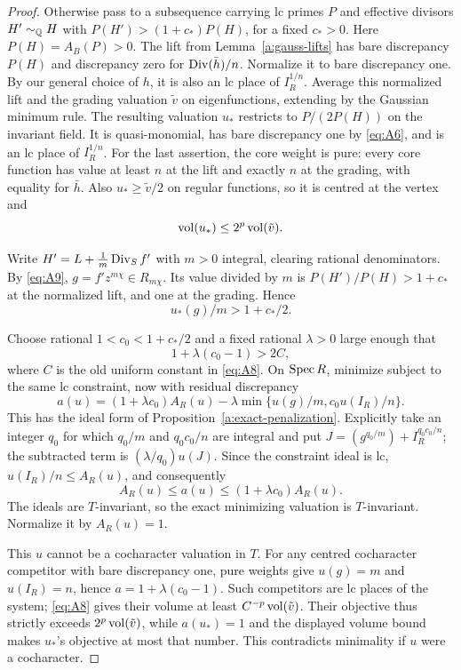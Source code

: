 \begin{proof}
Otherwise pass to a subsequence carrying lc primes \(P\) and effective
divisors \(H'\sim_{\mathbb Q}H\) with
\(P(H')>(1+c_*)P(H)\), for a fixed \(c_*>0\).
Here \(P(H)=A_B(P)>0\). The lift from
Lemma~\ref{a:gauss-lifts} has bare discrepancy \(P(H)\) and discrepancy
zero for \(\operatorname{Div}(\bar h)/n\). Normalize it to bare discrepancy one.
By our general choice of \(h\), it is also an lc place of \(I_R^{1/n}\).
Average this normalized lift and the grading valuation \(\tilde v\)
on eigenfunctions, extending by the Gaussian minimum rule. The resulting
valuation \(u_*\) restricts to \(P/(2P(H))\) on the invariant field.
It is quasi-monomial, has bare discrepancy one by \eqref{eq:A6}, and
is an lc place of \(I_R^{1/n}\). For the last assertion, the core
weight is pure: every core function has value at least \(n\) at the
lift and exactly \(n\) at the grading, with equality for \(\bar h\).
Also \(u_*\geq\tilde v/2\) on regular functions, so it is centred at
the vertex and
\[
                       \operatorname{vol}(u_*)\leq2^p\operatorname{vol}(\tilde v).
\]

Write \(H'=L+\frac1m\operatorname{Div}_S f'\) with \(m>0\) integral, clearing
rational denominators. By \eqref{eq:A9}, \(g=f'z^{m\chi}\in R_{m\chi}\).
Its value divided by \(m\) is \(P(H')/P(H)>1+c_*\) at the normalized
lift, and one at the grading. Hence
\[
                         u_*(g)/m>1+c_*/2.
\]

Choose rational \(1<c_0<1+c_*/2\) and a fixed rational \(\lambda>0\)
large enough that
\[
                         1+\lambda(c_0-1)>2C,
\]
where \(C\) is the old uniform constant in \eqref{eq:A8}.
On \(\operatorname{Spec} R\), minimize subject to the same lc constraint, now with
residual discrepancy
\[
 a(u)=(1+\lambda c_0)A_R(u)
          -\lambda\min\{u(g)/m,c_0u(I_R)/n\}.
\]
This has the ideal form of Proposition~\ref{a:exact-penalization}.
Explicitly take an integer \(q_0\) for which \(q_0/m\) and
\(q_0c_0/n\) are integral and put
\(J=(g^{q_0/m})+I_R^{q_0c_0/n}\); the subtracted term is
\((\lambda/q_0)u(J)\). Since the constraint ideal is lc,
\(u(I_R)/n\leq A_R(u)\), and consequently
\[
                  A_R(u)\leq a(u)\leq(1+\lambda c_0)A_R(u).
\]
The ideals are \(T\)-invariant, so the exact minimizing valuation is
\(T\)-invariant. Normalize it by \(A_R(u)=1\).

This \(u\) cannot be a cocharacter valuation in \(T\). For any centred
cocharacter competitor with bare discrepancy one, pure weights give
\(u(g)=m\) and \(u(I_R)=n\), hence
\(a=1+\lambda(c_0-1)\). Such competitors are lc places of the system;
\eqref{eq:A8} gives their volume at least
\(C^{-p}\operatorname{vol}(\tilde v)\). Their objective thus strictly exceeds
\(2^p\operatorname{vol}(\tilde v)\), while \(a(u_*)=1\) and the displayed volume
bound makes \(u_*\)'s objective at most that number. This contradicts
minimality if \(u\) were a cocharacter.


\end{proof}

